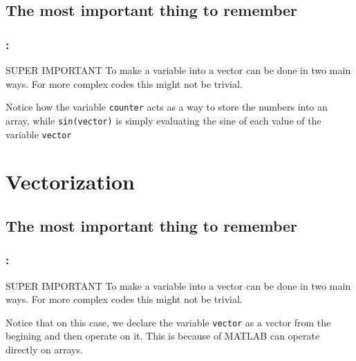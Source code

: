 \documentclass[11pt]{beamer}
\begin{document}
\subsection{The most important thing to remember}
\begin{frame}[fragile]
	\frametitle{\secname: \subsecname}
	
	\begin{alertblock}{SUPER IMPORTANT}
		To make a variable into a vector can be done in two main ways. For more complex codes this might not be trivial. 
	\end{alertblock}
	
	\begin{exampleblock}{}
		Notice how the variable \verb|counter| acts as a way to store the numbers into an array, while \verb|sin(vector)| is simply evaluating the sine of each value of the variable \verb|vector|
	\end{exampleblock}
\end{frame}

\section{Vectorization}
\subsection{The most important thing to remember}
\begin{frame}[fragile]
	\frametitle{\secname: \subsecname}
	
	\begin{alertblock}{SUPER IMPORTANT}
		To make a variable into a vector can be done in two main ways. For more complex codes this might not be trivial. 
	\end{alertblock}
	
	\begin{exampleblock}{}
		Notice that on this case, we declare the variable \verb|vector| as a vector from the begining and then operate on it. This is because of MATLAB can operate directly on arrays.
	\end{exampleblock}
\end{frame}
\end{document}
